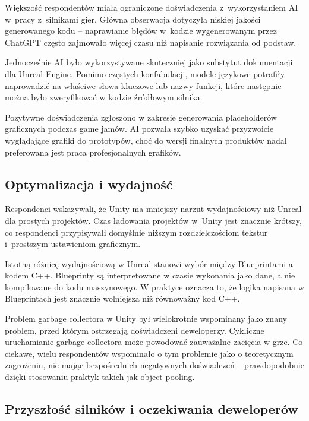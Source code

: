 Większość respondentów miała ograniczone doświadczenia
z~wykorzystaniem AI \\ w~pracy z~silnikami gier. Główna obserwacja
dotyczyła niskiej jakości generowanego kodu -- naprawianie błędów
w~kodzie wygenerowanym przez ChatGPT często zajmowało więcej czasu
niż napisanie rozwiązania od podstaw.

Jednocześnie AI było wykorzystywane skuteczniej jako substytut dokumentacji dla Unreal Engine. 
Pomimo częstych konfabulacji, modele językowe potrafiły naprowadzić na właściwe słowa kluczowe 
lub nazwy funkcji, które następnie można było zweryfikować w kodzie źródłowym silnika.


Pozytywne doświadczenia zgłoszono w zakresie generowania placeholderów graficznych podczas game jamów. AI pozwala szybko uzyskać przyzwoicie wyglądające grafiki do prototypów, choć do wersji finalnych produktów nadal preferowana jest praca profesjonalnych grafików.

\subsection{Optymalizacja i wydajność}
\label{subsec:optymalizacja}


Respondenci wskazywali, że Unity ma mniejszy narzut wydajnościowy niż
Unreal dla prostych projektów. Czas ładowania projektów w~Unity jest znacznie krótszy, co respondenci przypisywali domyślnie niższym rozdzielczościom tekstur i~prostszym ustawieniom graficznym.


Istotną różnicę wydajnościową w Unreal stanowi wybór między Blueprintami a kodem C++. Blueprinty są interpretowane w czasie wykonania jako dane, a nie kompilowane do kodu maszynowego. W praktyce oznacza to, że logika napisana w Blueprintach jest znacznie wolniejsza niż równoważny kod C++.


Problem garbage collectora w Unity był wielokrotnie wspominany jako znany problem, przed którym ostrzegają doświadczeni deweloperzy. Cykliczne uruchamianie garbage collectora może powodować zauważalne zacięcia w grze. Co ciekawe, wielu respondentów wspominało o tym problemie jako o teoretycznym zagrożeniu, nie mając bezpośrednich negatywnych doświadczeń -- prawdopodobnie dzięki stosowaniu praktyk takich jak object pooling.

\subsection{Przyszłość silników i oczekiwania deweloperów}
\label{subsec:przyszlosc}


